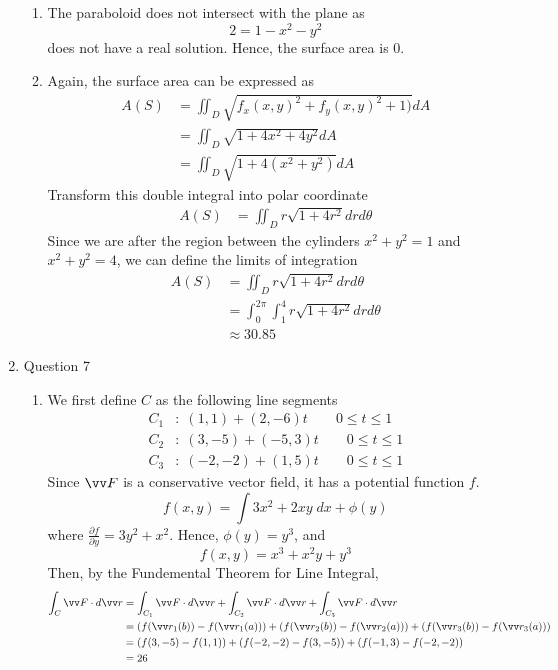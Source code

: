 \documentclass[11pt]{article}
\newcommand{\partialderiv}[2] {\frac{\partial #1}{\partial #2}}
\begin{document}
\begin{enumerate}
\begin{enumerate}
        \item The paraboloid does not intersect with the plane as
        $$
        2 = 1 - x^2 - y^2
        $$
        does not have a real solution. Hence, the surface area is 0.
        
        \item Again, the surface area can be expressed as
        $$
        \begin{aligned}
        A(S) &= \iint_D \sqrt{f_x(x,y)^2 + f_y(x,y)^2 + 1)} dA \\
        &= \iint_D \sqrt{1+4x^2+4y^2} dA \\
        &= \iint_D \sqrt{1+4(x^2+y^2)} dA
        \end{aligned}
        $$
        Transform this double integral into polar coordinate
        $$
        \begin{aligned}
        A(S) &= \iint_D r \sqrt{1+4r^2} dr d\theta
        \end{aligned}
        $$
        Since we are after the region between the cylinders $x^2+y^2=1$ and $x^2+y^2=4$, we can define the limits of integration
        $$
        \begin{aligned}
        A(S) &= \iint_D r \sqrt{1+4r^2} dr d\theta \\
        &= \int_0^{2\pi}\int_1^4 r \sqrt{1+4r^2} dr d\theta \\
        &\approx 30.85
        \end{aligned}
        $$
    \end{enumerate}
    
    \item Question 7
    \begin{enumerate}
        \item We first define $C$ as the following line segments
        $$
        \begin{aligned}
        C_1&:\; (1,1) + (2,-6)t \qquad 0 \leq t \leq 1 \\
        C_2&:\; (3,-5) + (-5,3)t \qquad 0 \leq t \leq 1 \\
        C_3&:\; (-2,-2) + (1,5)t \qquad 0 \leq t \leq 1
        \end{aligned}
        $$
        Since $\vv F$ is a conservative vector field, it has a potential function $f$.
        $$
        f(x,y) = \int 3x^2 + 2xy \; dx + \phi(y)
        $$
        where $\partialderiv{f}{y} = 3y^2+x^2$. Hence, $\phi(y) = y^3$, and
        $$
        f(x,y) = x^3+x^2y+y^3
        $$
        Then, by the Fundemental Theorem for Line Integral,
        $$
        \begin{aligned}
        \int_C \vv F \cdot d\vv r &= \int_{C_1} \vv F \cdot d\vv r + \int_{C_2} \vv F \cdot d\vv r + \int_{C_3} \vv F \cdot d\vv r \\
        &= (f(\vv r_1(b))-f(\vv r_1(a))) + (f(\vv r_2(b))-f(\vv r_2(a))) + (f(\vv r_3(b))-f(\vv r_3(a))) \\
        &= (f(3,-5)-f(1,1)) + (f(-2,-2)-f(3,-5)) + (f(-1,3)-f(-2,-2)) \\
        &= 26
        \end{aligned}
        $$
        

\end{enumerate}
\end{enumerate}
\end{document}
